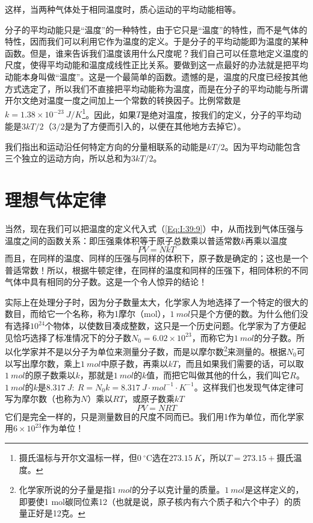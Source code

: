 这样，当两种气体处于相同温度时，质心运动的平均动能相等。

分子的平均动能只是“温度”的一种特性，由于它只是“温度”的特性，而不是气体的特性，因而我们可以利用它作为温度的定义。于是分子的平均动能即为温度的某种函数。但是，谁来告诉我们温度该用什么尺度呢？我们自己可以任意地定义温度的尺度，使得平均动能和温度成线性正比关系。要做到这一点最好的办法就是把平均动能本身叫做“温度”。这是一个最简单的函数。遗憾的是，温度的尺度已经按其他方式选定了，所以我们不直接把平均动能称为温度，而是在分子的平均动能与所谓开尔文绝对温度一度之间加上一个常数的转换因子。比例常数是$k=1.38\times 10^{-23}~J/K$\footnote{摄氏温标与开尔文温标一样，但$0~^\circ\text{C}$选在$273.15~K$，所以$T=273.15+$摄氏温度。}。因此，如果$T$是绝对温度，按我们的定义，分子的平均动能是$3kT/2$（$3/2$是为了方便而引入的，以便在其他地方去掉它）。

我们指出和运动沿任何特定方向的分量相联系的动能是$kT/2$。因为平均动能包含三个独立的运动方向，所以总和为$3kT/2$。

\section{理想气体定律}

当然，现在我们可以把温度的定义代入式（\ref{Eq:I:39:9}）中，从而找到气体压强与温度之间的函数关系：即压强乘体积等于原子总数乘以普适常数$k$再乘以温度
\begin{equation}
    \label{Eq:I:39:22}
    PV = NkT
\end{equation}
而且，在同样的温度、同样的压强与同样的体积下，原子数是确定的；这也是一个普适常数！所以，根据牛顿定律，在同样的温度和同样的压强下，相同体积的不同气体中具有相同的分子数。这是一个令人惊异的结论！

实际上在处理分子时，因为分子数量太大，化学家人为地选择了一个特定的很大的数目，而给它一个名称，称为1摩尔（mol），$1~mol$只是个方便的数。为什么他们没有选择$10^{24}$个物体，以使数目凑成整数，这只是一个历史问题。化学家为了方便起见恰巧选择了标准情况下的分子数$N_0=6.02\times 10^{23}$，而称它为$1~mol$的分子数。所以化学家并不是以分子为单位来测量分子数，而是以摩尔数\footnote{化学家所说的分子量是指$1~mol$的分子以克计量的质量。$1~mol$是这样定义的，即要使1 mol碳同位素12（也就是说，原子核内有六个质子和六个中子）的质量正好是12克。}来测量的。根据$N_0$可以写出摩尔数，乘上$1~mol$中原子数，再乘以$kT$，而且如果我们需要的话，可以取$1~mol$的原子数乘以$k$，那就是$1~mol$的$k$值，而把它叫做其他的什么，我们叫它$R$。$1~mol$的$k$是$8.317~J:~R=N_0k=8.317~J\cdot mol^{-1}\cdot K^{-1}$。这样我们也发现气体定律可写为摩尔数（也称为$N$）乘以$RT$，或原子数乘$kT$
\begin{equation}
    \label{Eq:I:39:23}
    PV = NRT
\end{equation}
它们是完全一样的，只是测量数目的尺度不同而已。我们用1作为单位，而化学家用$6\times 10^{23}$作为单位！

